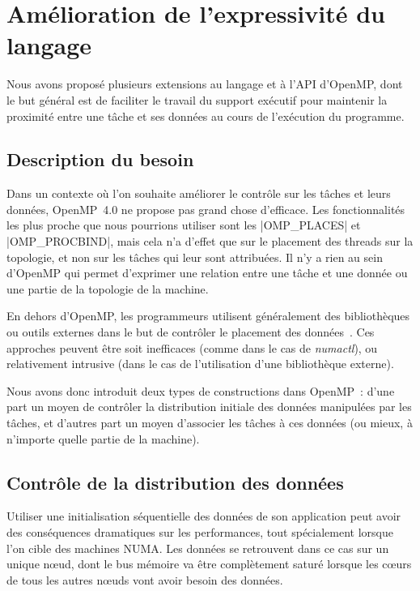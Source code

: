 \section{Amélioration de l'expressivité du langage}\label{sec:openmp:langage}

Nous avons proposé plusieurs extensions au langage et à l'API d'OpenMP, dont le but général est de faciliter le travail du support exécutif pour maintenir la proximité entre une tâche et ses données au cours de l'exécution du programme.

\subsection{Description du besoin}

Dans un contexte où l'on souhaite améliorer le contrôle sur les tâches et leurs données, OpenMP~4.0 ne propose pas grand chose d'efficace.
Les fonctionnalités les plus proche que nous pourrions utiliser sont les |OMP_PLACES| et |OMP_PROCBIND|, mais cela n'a d'effet que sur le placement des threads sur la topologie, et non sur les tâches qui leur sont attribuées. Il n'y a rien au sein d'OpenMP qui permet d'exprimer une relation entre une tâche et une donnée ou une partie de la topologie de la machine.

En dehors d'OpenMP, les programmeurs utilisent généralement des bibliothèques ou outils externes dans le but de contrôler le placement des données~\cite{Pousa2009, Broquedis2010a}.
Ces approches peuvent être soit inefficaces (comme dans le cas de \emph{numactl}), ou relativement intrusive (dans le cas de l'utilisation d'une bibliothèque externe).

Nous avons donc introduit deux types de constructions dans OpenMP~: d'une part un moyen de contrôler la distribution initiale des données manipulées par les tâches, et d'autres part un moyen d'associer les tâches à ces données (ou mieux, à n'importe quelle partie de la machine).

\subsection{Contrôle de la distribution des données}\label{sec:openmp:langage:init}

Utiliser une initialisation séquentielle des données de son application peut avoir des conséquences dramatiques sur les performances, tout spécialement lorsque l'on cible des machines NUMA.
Les données se retrouvent dans ce cas sur un unique nœud, dont le bus mémoire va être complètement saturé lorsque les cœurs de tous les autres nœuds vont avoir besoin des données.

